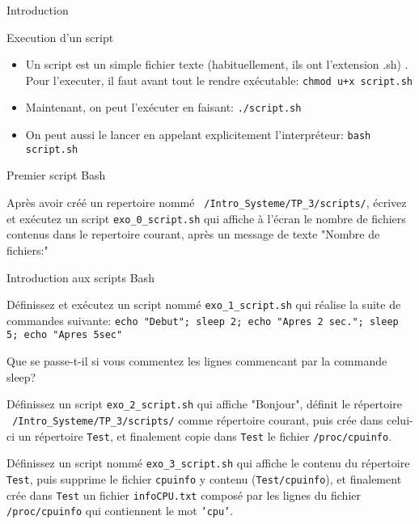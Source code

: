 \begin{frame}[fragile]{Introduction}
\begin{block}{Execution d'un script}
\begin{itemize}
\item Un script est un simple fichier texte (habituellement, ils ont l'extension \alert{.sh}) . Pour l'executer, il faut avant tout le rendre exécutable: \verb|chmod u+x script.sh|
\item Maintenant, on peut l'exécuter en faisant: \verb|./script.sh|
\item On peut aussi le lancer en appelant explicitement l'interpréteur: \verb|bash script.sh|
\end{itemize}
\end{block}


  \begin{exercicelet}{Premier script Bash}
    \begin{questions}
    \item Après avoir créé un repertoire nommé \texttt{~/Intro\_Systeme/TP\_3/scripts/}, écrivez et exécutez un script \texttt{exo\_0\_script.sh} qui affiche à l'écran le nombre de fichiers contenus dans le repertoire courant, après un message de texte "Nombre de fichiers:"
    \end{questions}
  \end{exercicelet}


\end{frame}


\begin{exercice}
  \begin{exercicelet}{Introduction aux scripts Bash}
    \begin{questions}
    \item Définissez et exécutez un script nommé \texttt{exo\_1\_script.sh} qui réalise la suite de commandes suivante: \texttt{echo "Debut"; sleep 2; echo "Apres 2 sec."; sleep 5; echo "Apres 5sec"}
    \item Que se passe-t-il si vous commentez les lignes commencant par la commande sleep?
	\item Définissez un script \texttt{exo\_2\_script.sh} qui affiche "Bonjour", définit le répertoire \texttt{~/Intro\_Systeme/TP\_3/scripts/} comme répertoire courant, puis crée dans celui-ci un répertoire \texttt{Test}, et finalement copie dans \texttt{Test} le fichier \texttt{/proc/cpuinfo}.
	\item Définissez un script nommé \texttt{exo\_3\_script.sh} qui affiche le contenu du répertoire \texttt{Test}, puis supprime le fichier \texttt{cpuinfo} y contenu (\texttt{Test/cpuinfo}), et finalement crée dans \texttt{Test} un fichier \texttt{infoCPU.txt} composé par les lignes du fichier \texttt{/proc/cpuinfo} qui contiennent le mot \texttt{'cpu'}.
    \end{questions}
  \end{exercicelet}
\end{exercice}

